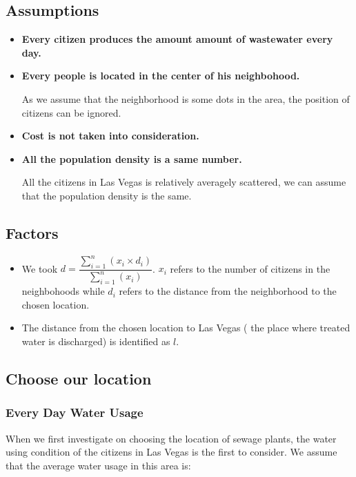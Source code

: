 \documentclass[12pt]{article}
\theoremstyle{definition}
\theoremstyle{remark}
\numberwithin{equation}{section}
\begin{document}
	\subsection{Assumptions}
		\begin{itemize}
			\item \textbf{Every citizen produces the amount amount of wastewater every day.}

			\item \textbf{Every people is located in the center of his neighbohood.}
			
			As we assume that the neighborhood is some dots in the area, the position of citizens can be ignored.

			\item \textbf{Cost is not taken into consideration.}

			\item \textbf{All the population density is a same number.}
			
			All the citizens in Las Vegas is relatively averagely scattered, we can assume that the population density is the same.
		\end{itemize}

	\subsection{Factors}
		\begin{itemize}
			\item We took $d=\dfrac{\sum\limits_{i=1}^n(x_i\times d_i)}{\sum\limits_{i=1}^n(x_i)}$. $x_i$ refers to the number 
			of citizens in the neighbohoods while $d_i$ refers to the distance from the neighborhood to the chosen
			location.
			\item The distance from the chosen location to Las Vegas ( the place where treated water is discharged) is identified
			as $l$.
		\end{itemize}

	\subsection{Choose our location}
		\subsubsection{Every Day Water Usage}
			When we first investigate on choosing the location of sewage plants, the water using condition of the citizens in Las Vegas is the first to consider.
			We assume that the average water usage in this area is:
\end{document}
